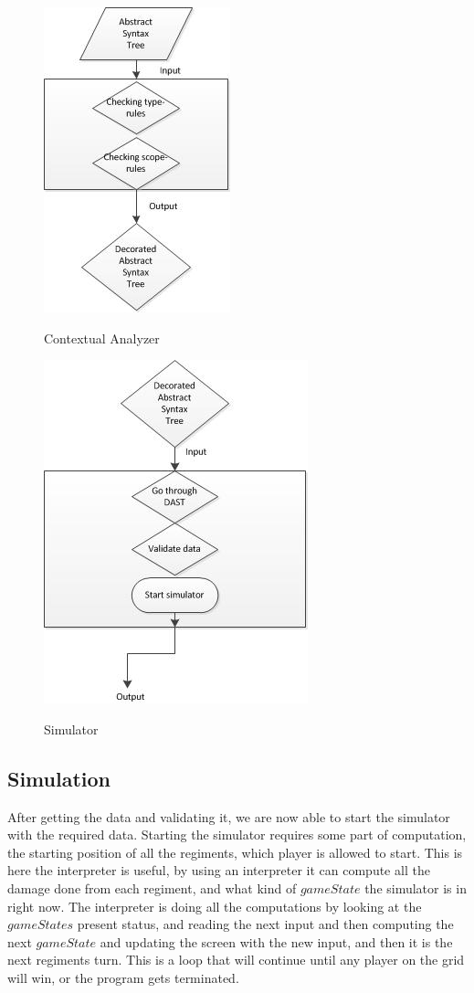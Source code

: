 \begin{figure}[H]
\centering
\includegraphics[scale=1]{rapport/6/figures/contextual_analyzer}
\label{fig:contextual_analyzer}
\caption{Contextual Analyzer}
\end{figure}

\begin{figure}[H]
\centering
\includegraphics[scale=1]{rapport/6/figures/simulator}
\label{fig:simulator}
\caption{Simulator}
\end{figure}


\subsection{Simulation}

After getting the data and validating it, we are now able to start the simulator with the required data. 
Starting the simulator requires some part of computation, the starting position of all the regiments, which player is allowed to start. This is here the interpreter is useful, by using an interpreter it can compute all the damage done from each regiment, and what kind of $gameState$ the simulator is in right now. The interpreter is doing all the computations by looking at the $gameStates$ present status, and reading the next input and then computing the next $gameState$ and updating the screen with the new input, and then it is the next regiments turn. This is a loop that will continue until any player on the grid will win, or the program gets terminated.







